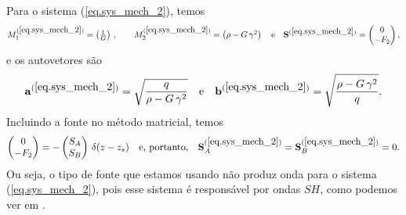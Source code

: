 Para o sistema (\ref{eq.sys_mech_2}), temos 
\begin{equation*}
M_1^{(\ref{eq.sys_mech_2})}=\begin{pmatrix}
\frac{1}{G}
\end{pmatrix}\,,\quad\quad
M_2^{(\ref{eq.sys_mech_2})}=\begin{pmatrix}
\rho-G\,\gamma^2
\end{pmatrix}\quad\text{e}\quad
\mathbf{S}^{(\ref{eq.sys_mech_2})}=\begin{pmatrix}
0\\-F_2
\end{pmatrix},
\end{equation*}
e os autovetores s\~ao
\begin{equation*}
\mathbf{a}^{(\ref{eq.sys_mech_2})}=
\sqrt{\frac{q}{\rho-G\,\gamma^2}}
\quad\text{e}\quad
\mathbf{b}^{(\ref{eq.sys_mech_2})}=
\sqrt{\frac{\rho-G\,\gamma^2}{q}}.
\end{equation*}
Incluindo a fonte no m\'etodo matricial, temos
\begin{equation*}
\begin{pmatrix}
0\\
-F_2
\end{pmatrix}
=-
\begin{pmatrix}
S_A\\
S_B
\end{pmatrix}\,\delta(z-z_s)\quad\text{e, portanto,}\quad
\mathbf{S}_A^{(\ref{eq.sys_mech_2})}=\mathbf{S}_B^{(\ref{eq.sys_mech_2})}=0.
\end{equation*}
Ou seja, o tipo de fonte que estamos usando n\~ao produz onda para o sistema (\ref{eq.sys_mech_2}), pois esse sistema \'e respons\'avel por ondas $SH$, como podemos ver em \cite{pride_94}.

